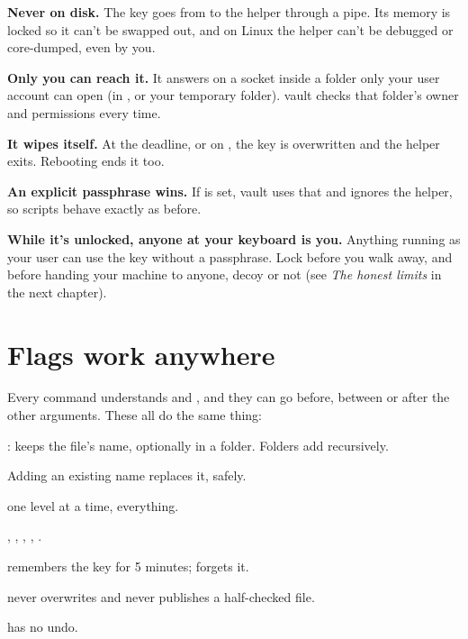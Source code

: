 \documentclass[10pt,oneside,openany]{book}
\begin{document}
\begin{checks}
  \item \textbf{Never on disk.} The key goes from  to the helper
        through a pipe. Its memory is locked so it can't be swapped out, and
        on Linux the helper can't be debugged or core-dumped, even by you.
  \item \textbf{Only you can reach it.} It answers on a socket inside a folder
        only your user account can open (in , or
        your temporary folder). vault checks that folder's owner and
        permissions every time.
  \item \textbf{It wipes itself.} At the deadline, or on , the
        key is overwritten and the helper exits. Rebooting ends it too.
  \item \textbf{An explicit passphrase wins.} If  is
        set, vault uses that and ignores the helper, so scripts behave
        exactly as before.
\end{checks}

\begin{headsup}
\textbf{While it's unlocked, anyone at your keyboard is you.} Anything
running as your user can use the key without a passphrase. Lock before you
walk away, and before handing your machine to anyone, decoy or not (see
\emph{The honest limits} in the next chapter).
\end{headsup}

\section{Flags work anywhere}

Every command understands  and , and they can
go before, between or after the other arguments. These all do the same thing:


\begin{pocket}
\begin{pocketlist}
  \item {}: keeps the file's name, optionally in a folder. Folders add recursively.
  \item Adding an existing name replaces it, safely.
  \item {} one level at a time,  everything.
  \item {}, , , , .
  \item {} remembers the key for 5 minutes;  forgets it.
  \item {} never overwrites and never publishes a half-checked file.
  \item {} has no undo.
\end{pocketlist}
\end{pocket}
\end{document}
